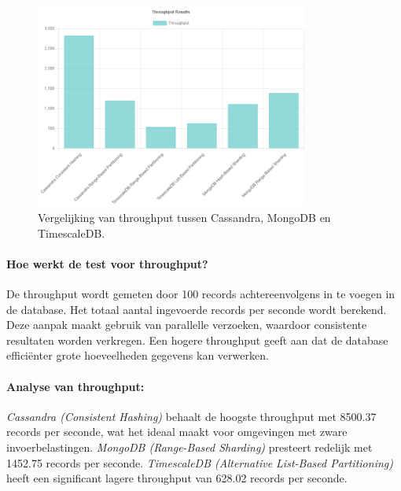 \begin{figure}[H]
	\centering
	\includegraphics[width=0.8\textwidth]{Throughput.png}
	\caption{Vergelijking van throughput tussen Cassandra, MongoDB en TimescaleDB.}
	\label{fig:throughput-comparison}
\end{figure}

\paragraph{Hoe werkt de test voor throughput?} 
De throughput wordt gemeten door 100 records achtereenvolgens in te voegen in de database. Het totaal aantal ingevoerde records per seconde wordt berekend. Deze aanpak maakt gebruik van parallelle verzoeken, waardoor consistente resultaten worden verkregen. Een hogere throughput geeft aan dat de database efficiënter grote hoeveelheden gegevens kan verwerken.

\paragraph{Analyse van throughput:}
\textit{Cassandra (Consistent Hashing)} behaalt de hoogste throughput met 8500.37 records per seconde, wat het ideaal maakt voor omgevingen met zware invoerbelastingen. \textit{MongoDB (Range-Based Sharding)} presteert redelijk met 1452.75 records per seconde. \textit{TimescaleDB (Alternative List-Based Partitioning)} heeft een significant lagere throughput van 628.02 records per seconde.

